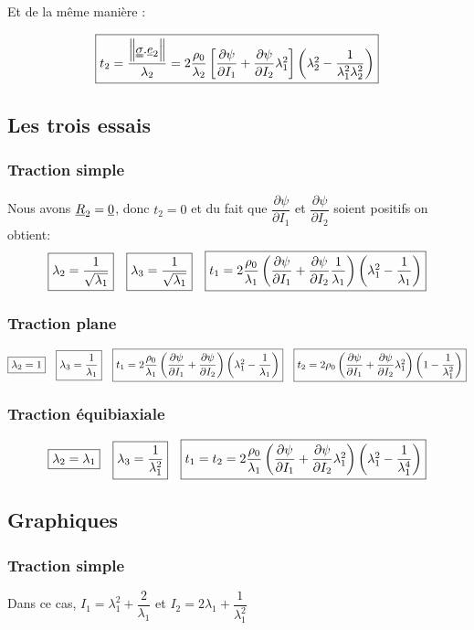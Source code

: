 \documentclass[a4paper,11pt]{article}
\begin{document}
Et de la m\^eme mani\`ere :

$$ \fbox{$t_2=\dfrac{\left\|\uuline{\sigma}.\uline{e}_2\right\|}{\lambda_2}= 2\dfrac{\rho_0}{\lambda_2}\left[\dfrac{\partial \psi}{\partial I_1}+\dfrac{\partial \psi}{\partial I_2}\lambda_1^2\right]\left(\lambda_2^2-\dfrac{1}{\lambda_1^2\lambda_2^2} \right)$}
$$

\subsection{Les trois essais}
\subsubsection{Traction simple} Nous avons $\uline{R}_2=\uline{0}$, donc $t_2=0$ et du fait que $\dfrac{\partial \psi}{\partial I_1}$ et $\dfrac{\partial \psi}{\partial I_2}$ soient positifs on obtient: $$\fbox{$\lambda_2=\dfrac{1}{\sqrt{\lambda_1}}$} \quad \fbox{$\lambda_3=\dfrac{1}{\sqrt{\lambda_1}}$} \quad \fbox{$t_1=2\dfrac{\rho_0}{\lambda_1}\left(\dfrac{\partial \psi}{\partial I_1}+\dfrac{\partial \psi}{\partial I_2}\dfrac{1}{\lambda_1} \right)\left(\lambda_1^2-\dfrac{1}{\lambda_1}\right) $}$$

\subsubsection{Traction plane} $$\fbox{$\lambda_2=1$}\quad \fbox{$ \lambda_3=\dfrac{1}{\lambda_1}$}\quad\fbox{$t_1=2\dfrac{\rho_0}{\lambda_1}\left(\dfrac{\partial \psi}{\partial I_1}+\dfrac{\partial \psi}{\partial I_2} \right)\left(\lambda_1^2-\dfrac{1}{\lambda_1}\right)$}\quad\fbox{$t_2=2\rho_0\left(\dfrac{\partial \psi}{\partial I_1}+\dfrac{\partial \psi}{\partial I_2}\lambda_1^2 \right)\left(1-\dfrac{1}{\lambda_1^2}\right)$}$$

\subsubsection{Traction équibiaxiale}$$\fbox{$\lambda_2=\lambda_1$}\quad \fbox{$ \lambda_3=\dfrac{1}{\lambda_1^2}$}\quad\fbox{$t_1=t_2=2\dfrac{\rho_0}{\lambda_1}\left(\dfrac{\partial \psi}{\partial I_1}+\dfrac{\partial \psi}{\partial I_2}\lambda_1^2 \right)\left(\lambda_1^2-\dfrac{1}{\lambda_1^4}\right)$}$$

\subsection{Graphiques}
\subsubsection{Traction simple}
Dans ce cas, $I_1=\lambda_1^2+\dfrac{2}{\lambda_1}$ et $I_2=2\lambda_1+\dfrac{1}{\lambda_1^2}$
\end{document}
